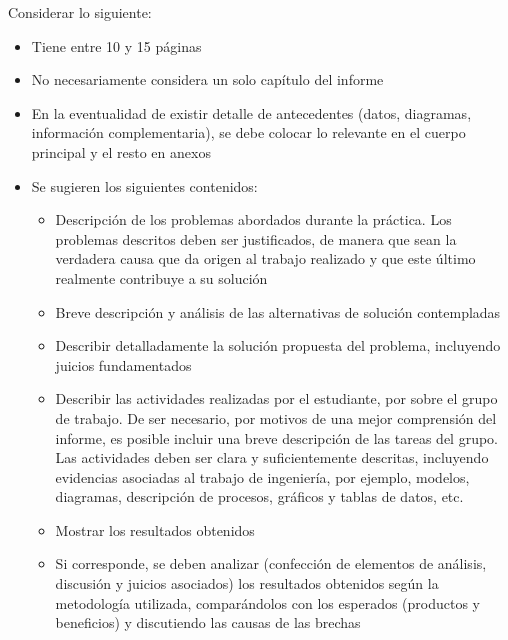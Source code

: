 \documentclass[oneside,12pt, letterpaper, titlepage]{book}
\begin{document}
Considerar lo siguiente: 
\begin{itemize}
    \item Tiene entre 10 y 15 páginas 
    \item No necesariamente considera un solo capítulo del informe 
    \item En la eventualidad de existir detalle de antecedentes (datos, diagramas, información complementaria), se debe colocar lo relevante en el cuerpo principal y el resto en anexos 

    \item Se sugieren los siguientes contenidos: 

    \begin{itemize}
        \item Descripción de los problemas abordados durante la práctica. Los problemas descritos deben ser justificados, de manera que sean la verdadera causa que da origen al trabajo realizado y que este último realmente contribuye a su solución 
        \item Breve descripción y análisis de las alternativas de solución contempladas 
        \item Describir detalladamente la solución propuesta del problema, incluyendo juicios fundamentados 
        \item Describir las actividades realizadas por el estudiante, por sobre el grupo de trabajo. De ser necesario, por motivos de una mejor comprensión del informe, es posible incluir una breve descripción de las tareas del grupo. Las actividades deben ser clara y suficientemente descritas, incluyendo evidencias asociadas al trabajo de ingeniería, por ejemplo, modelos, diagramas, descripción de procesos, gráficos y tablas de datos, etc. 
        \item Mostrar los resultados obtenidos 
        \item Si corresponde, se deben analizar (confección de elementos de análisis, discusión y juicios asociados) los resultados obtenidos según la metodología utilizada, comparándolos con los esperados (productos y beneficios) y discutiendo las causas de las brechas
    \end{itemize}
\end{itemize}
\end{document}
